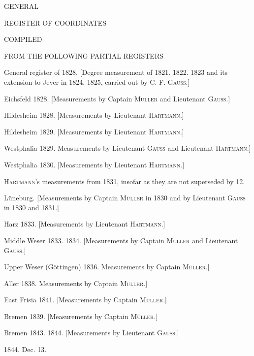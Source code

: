 \clearpage{}%
\thispagestyle{empty}
\begin{center}\Large GENERAL\par\medskip REGISTER OF COORDINATES\par\bigskip
\normalsize COMPILED\par\medskip FROM THE FOLLOWING PARTIAL REGISTERS\end{center}
\smallskip
\begin{list}{}{\setlength{\leftmargin}{2.5em}\setlength{\labelwidth}{2.3em}\setlength{\labelsep}{.2em}\setlength{\itemsep}{3pt}\setlength{\parsep}{0pt}}
\item[No. 1)] General register of 1828. [Degree measurement of 1821. 1822. 1823 and its extension to Jever in 1824. 1825, carried out by C. F. \textsc{Gauss}.]
\item[2)] Eichsfeld 1828. [Measurements by Captain \textsc{Müller} and Lieutenant \textsc{Gauss}.]
\item[3)] Hildesheim 1828. [Measurements by Lieutenant \textsc{Hartmann}.]
\item[4)] Hildesheim 1829. [Measurements by Lieutenant \textsc{Hartmann}.]
\item[5)] Westphalia 1829. Measurements by Lieutenant \textsc{Gauss} and Lieutenant \textsc{Hartmann}.]
\item[6)] Westphalia 1830. [Measurements by Lieutenant \textsc{Hartmann}.]
\item[6*)] \textsc{Hartmann}’s measurements from 1831, insofar as they are not superseded by 12.
\item[7)] Lüneburg. [Measurements by Captain \textsc{Müller} in 1830 and by Lieutenant \textsc{Gauss} in 1830 and 1831.]
\item[8)] Harz 1833. [Measurements by Lieutenant \textsc{Hartmann}.]
\item[9)] Middle Weser 1833. 1834. [Measurements by Captain \textsc{Müller} and Lieutenant \textsc{Gauss}.]
\item[10)] Upper Weser (Göttingen) 1836. Measurements by Captain \textsc{Müller}.]
\item[11)] Aller 1838. Measurements by Captain \textsc{Müller}.]
\item[12)] East Frisia 1841. [Measurements by Captain \textsc{Müller}.]
\item[13)] Bremen 1839. [Measurements by Captain \textsc{Müller}.]
\item[14)] Bremen 1843. 1844. [Measurements by Lieutenant \textsc{Gauss}.]
\end{list}
\begin{center}1844. Dec. 13.\end{center}

